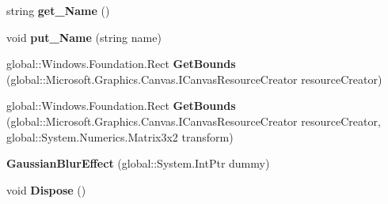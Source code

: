 \begin{DoxyCompactItemize}
\item 
\mbox{\label{class_microsoft_1_1_graphics_1_1_canvas_1_1_effects_1_1_gaussian_blur_effect_aa4fc095514a67d0f4aa6ef9577e46833}} 
string {\bfseries get\+\_\+\+Name} ()
\item 
\mbox{\label{class_microsoft_1_1_graphics_1_1_canvas_1_1_effects_1_1_gaussian_blur_effect_a98e8bd16e0d6aef72ae476b241eb79da}} 
void {\bfseries put\+\_\+\+Name} (string name)
\item 
\mbox{\label{class_microsoft_1_1_graphics_1_1_canvas_1_1_effects_1_1_gaussian_blur_effect_a67d0aa0daf4bf8acde189a04deefd508}} 
global\+::\+Windows.\+Foundation.\+Rect {\bfseries Get\+Bounds} (global\+::\+Microsoft.\+Graphics.\+Canvas.\+I\+Canvas\+Resource\+Creator resource\+Creator)
\item 
\mbox{\label{class_microsoft_1_1_graphics_1_1_canvas_1_1_effects_1_1_gaussian_blur_effect_a650b47ec2f52a2c56cdc458ed3800b47}} 
global\+::\+Windows.\+Foundation.\+Rect {\bfseries Get\+Bounds} (global\+::\+Microsoft.\+Graphics.\+Canvas.\+I\+Canvas\+Resource\+Creator resource\+Creator, global\+::\+System.\+Numerics.\+Matrix3x2 transform)
\item 
\mbox{\label{class_microsoft_1_1_graphics_1_1_canvas_1_1_effects_1_1_gaussian_blur_effect_a001441f34b40b123ff0a4f6c0fa5adbb}} 
{\bfseries Gaussian\+Blur\+Effect} (global\+::\+System.\+Int\+Ptr dummy)
\item 
\mbox{\label{class_microsoft_1_1_graphics_1_1_canvas_1_1_effects_1_1_gaussian_blur_effect_a9cea4f6122394e148cdf4a3eb0624aa4}} 
void {\bfseries Dispose} ()
\item 
\mbox{\label{class_microsoft_1_1_graphics_1_1_canvas_1_1_effects_1_1_gaussian_blur_effect_a7b01eda1ee6f9bb08a3c9086d7ef1edb}} 

\end{DoxyCompactItemize}

